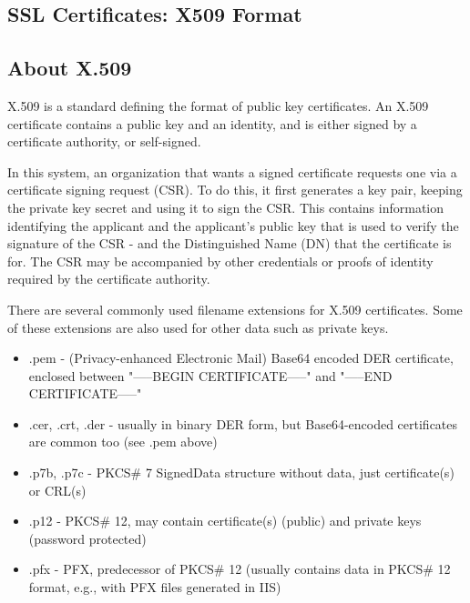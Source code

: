 \documentclass[12pt]{article}
\begin{document}
\begin{large}
\section{SSL Certificates: X509 Format}

\subsection{About X.509}

X.509 is a standard defining the format of public key certificates. An X.509 certificate contains a public key and an identity, and is either signed by a certificate authority, or self-signed. 

In this system, an organization that wants a signed certificate requests one via a certificate signing request (CSR). To do this, it first generates a key pair, keeping the private key secret and using it to sign the CSR. This contains information identifying the applicant and the applicant's public key that is used to verify the signature of the CSR - and the Distinguished Name (DN) that the certificate is for. The CSR may be accompanied by other credentials or proofs of identity required by the certificate authority.

There are several commonly used filename extensions for X.509 certificates. Some of these extensions are also used for other data such as private keys.

\begin{itemize}

\item .pem - (Privacy-enhanced Electronic Mail) Base64 encoded DER certificate, enclosed between "-----BEGIN CERTIFICATE-----" and "-----END CERTIFICATE-----"

\item .cer, .crt, .der - usually in binary DER form, but Base64-encoded certificates are common too (see .pem above)

\item .p7b, .p7c - PKCS\# 7 SignedData structure without data, just certificate(s) or CRL(s)

\item .p12 - PKCS\# 12, may contain certificate(s) (public) and private keys (password protected)

\item .pfx - PFX, predecessor of PKCS\# 12 (usually contains data in PKCS\# 12 format, e.g., with PFX files generated in IIS)

\end{itemize}


\end{large}
\end{document}
